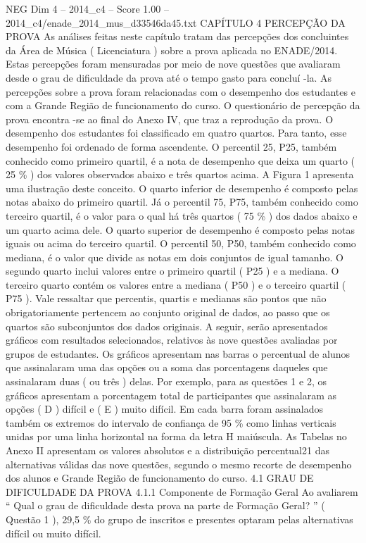 \begin{textsample}{NEG Dim 4 – 2014\_c4 – Score 1.00 – 2014\_c4/enade\_2014\_mus\_d33546da45.txt}  \label{ex:f4_neg_155}
CAPÍTULO 4 PERCEPÇÃO DA PROVA As análises feitas neste capítulo tratam das percepções dos concluintes da Área de Música ( Licenciatura ) sobre a prova aplicada no ENADE/2014.
Estas percepções foram mensuradas por meio de nove questões que avaliaram desde o grau de dificuldade da prova até o tempo gasto para concluí -la.
As percepções sobre a prova foram relacionadas com o desempenho dos estudantes e com a Grande Região de funcionamento do curso.
O questionário de percepção da prova encontra -se ao final do Anexo IV, que traz a reprodução da prova.
O desempenho dos estudantes foi classificado em quatro quartos.
Para tanto, esse desempenho foi ordenado de forma ascendente.
O percentil 25, P25, também conhecido como primeiro quartil, é a nota de desempenho que deixa um quarto ( 25 \% ) dos valores observados abaixo e três quartos acima.
A Figura 1 apresenta uma ilustração deste conceito.
O quarto inferior de desempenho é composto pelas notas abaixo do primeiro quartil.
Já o percentil 75, P75, também conhecido como terceiro quartil, é o valor para o qual há três quartos ( 75 \% ) dos dados abaixo e um quarto acima dele.
O quarto superior de desempenho é composto pelas notas iguais ou acima do terceiro quartil.
O percentil 50, P50, também conhecido como mediana, é o valor que divide as notas em dois conjuntos de igual tamanho.
O segundo quarto inclui valores entre o primeiro quartil ( P25 ) e a mediana.
O terceiro quarto contém os valores entre a mediana ( P50 ) e o terceiro quartil ( P75 ).
Vale ressaltar que percentis, quartis e medianas são pontos que não obrigatoriamente pertencem ao conjunto original de dados, ao passo que os quartos são subconjuntos dos dados originais.
A seguir, serão apresentados gráficos com resultados selecionados, relativos às nove questões avaliadas por grupos de estudantes.
Os gráficos apresentam nas barras o percentual de alunos que assinalaram uma das opções ou a soma das porcentagens daqueles que assinalaram duas ( ou três ) delas.
Por exemplo, para as questões 1 e 2, os gráficos apresentam a porcentagem total de participantes que assinalaram as opções ( D ) difícil e ( E ) muito difícil.
Em cada barra foram assinalados também os extremos do intervalo de confiança de 95 \% como linhas verticais unidas por uma linha horizontal na forma da letra H maiúscula.
As Tabelas no Anexo II apresentam os valores absolutos e a distribuição percentual21 das alternativas válidas das nove questões, segundo o mesmo recorte de desempenho dos alunos e Grande Região de funcionamento do curso. 4.1 GRAU DE DIFICULDADE DA PROVA 4.1.1 Componente de Formação Geral Ao avaliarem “ Qual o grau de dificuldade desta prova na parte de Formação Geral? ” ( Questão 1 ), 29,5 \% do grupo de inscritos e presentes optaram pelas alternativas difícil ou muito difícil.

\end{textsample}

